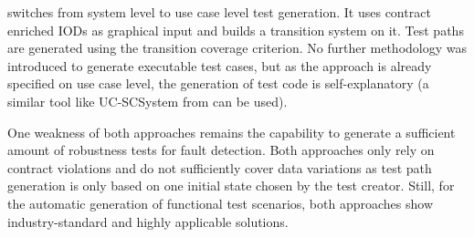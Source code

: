 \cite{NajlaRaza2007} switches from system level to use case level test generation. It uses contract enriched IODs as graphical input and builds a transition system on it. Test paths are generated using the transition coverage criterion. No further methodology was introduced to generate executable test cases, but as the approach is already specified on use case level, the generation of test code is self-explanatory (a similar tool like UC-SCSystem from \cite{ClementineNebut2006} can be used).

One weakness of both approaches remains the capability to generate a sufficient amount of robustness tests for fault detection. Both approaches only rely on contract violations and do not sufficiently cover data variations as test path generation is only based on one initial state chosen by the test creator. Still, for the automatic generation of functional test scenarios, both approaches show industry-standard and highly applicable solutions.